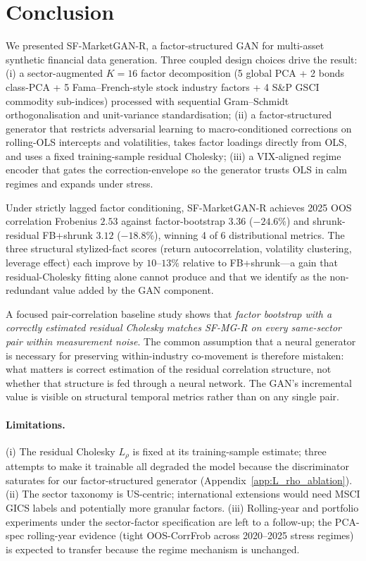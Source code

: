 \section{Conclusion}
\label{sec:conclusion}

We presented SF-MarketGAN-R, a factor-structured GAN for multi-asset synthetic financial data generation. Three coupled design choices drive the result: (i) a sector-augmented $K=16$ factor decomposition (5 global PCA + 2 bonds class-PCA + 5 Fama--French-style stock industry factors + 4 S\&P GSCI commodity sub-indices) processed with sequential Gram--Schmidt orthogonalisation and unit-variance standardisation; (ii) a factor-structured generator that restricts adversarial learning to macro-conditioned corrections on rolling-OLS intercepts and volatilities, takes factor loadings directly from OLS, and uses a fixed training-sample residual Cholesky; (iii) a VIX-aligned regime encoder that gates the correction-envelope so the generator trusts OLS in calm regimes and expands under stress.

Under strictly lagged factor conditioning, SF-MarketGAN-R achieves 2025 OOS correlation Frobenius $2.53$ against factor-bootstrap $3.36$ ($-24.6\%$) and shrunk-residual FB+shrunk $3.12$ ($-18.8\%$), winning 4 of 6 distributional metrics. The three structural stylized-fact scores (return autocorrelation, volatility clustering, leverage effect) each improve by $10$--$13\%$ relative to FB+shrunk---a gain that residual-Cholesky fitting alone cannot produce and that we identify as the non-redundant value added by the GAN component.

A focused pair-correlation baseline study shows that \emph{factor bootstrap with a correctly estimated residual Cholesky matches SF-MG-R on every same-sector pair within measurement noise}. The common assumption that a neural generator is necessary for preserving within-industry co-movement is therefore mistaken: what matters is correct estimation of the residual correlation structure, not whether that structure is fed through a neural network. The GAN's incremental value is visible on structural temporal metrics rather than on any single pair.

\paragraph{Limitations.}
(i) The residual Cholesky $L_\rho$ is fixed at its training-sample estimate; three attempts to make it trainable all degraded the model because the discriminator saturates for our factor-structured generator (Appendix~\ref{app:L_rho_ablation}). (ii) The sector taxonomy is US-centric; international extensions would need MSCI GICS labels and potentially more granular factors. (iii) Rolling-year and portfolio experiments under the sector-factor specification are left to a follow-up; the PCA-spec rolling-year evidence (tight OOS-CorrFrob across 2020--2025 stress regimes) is expected to transfer because the regime mechanism is unchanged.

